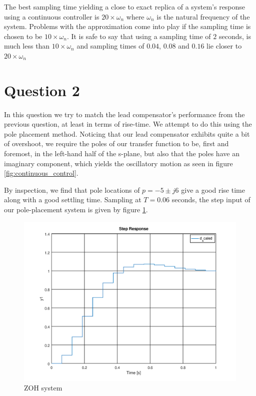 \documentclass[a4paper, 12pt]{article}
\begin{document}
The best sampling time yielding a close to exact replica of a system's response
using a continuous controller is $20\times \omega_n$ where $\omega_n$ is the
natural frequency of the system. Problems with the approximation come into play if the
sampling time is chosen to be $10\times \omega_n$. It is safe to say that using
a sampling time of $2$ seconds, is much less than $10\times \omega_n$ and
sampling times of $0.04$, $0.08$ and $0.16$ lie closer to $20\times \omega_n$





\section{Question 2}

In this question we try to match the lead compensator's performance from the
previous question, at least in terms of rise-time. We attempt to do this using
the pole placement method. Noticing that our lead compensator exhibits quite a
bit of overshoot, we require the poles of our transfer function to be, first
and foremost, in the left-hand half of the s-plane, but also that the poles
have an imaginary component, which yields the oscillatory motion as seen in
figure \ref{fig:continuous_control}.

By inspection, we find that pole locations of $p = -5 \pm j6$ give a good rise
time along with a good settling time. Sampling at $T = 0.06$ seconds, the step
input of our pole-placement system is given by figure \ref{fig:2_1}.

\begin{figure}[H]
	\centering
	\includegraphics[width=\textwidth]{./img/2_1.png}
	\caption{ZOH system}
	\label{fig:2_1}
\end{figure}
\end{document}
